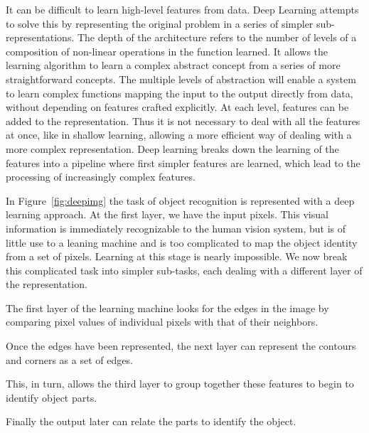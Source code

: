 It can be difficult to learn high-level features from data. Deep Learning attempts to solve this by representing the original problem in a series of simpler sub-representations. The depth of the architecture refers to the number of levels of a composition of non-linear operations in the function learned. It allows the learning algorithm to learn a complex abstract concept from a series of more straightforward concepts. The multiple levels of abstraction will enable a system to learn complex functions mapping the input to the output directly from data, without depending on features crafted explicitly. At each level, features can be added to the representation. Thus it is not necessary to deal with all the features at once, like in shallow learning, allowing a more efficient way of dealing with a more complex representation. Deep learning breaks down the learning of the features into a pipeline where first simpler features are learned, which lead to the processing of increasingly complex features. 



In Figure~\ref{fig:deepimg} the task of object recognition is represented with a deep learning approach. At the first layer, we have the input pixels. This visual information is immediately recognizable to the human vision system, but is of little use to a leaning machine and is too complicated to map the object identity from a set of pixels. Learning at this stage is nearly impossible. We now break this complicated task into simpler sub-tasks, each dealing with a different layer of the representation. 
\begin{itemize*}
\item The first layer of the learning machine looks for the edges in the image by comparing pixel values of individual pixels with that of their neighbors. 
\item Once the edges have been represented, the next layer can represent the contours and corners as a set of edges. 
\item This, in turn, allows the third layer to group together these features to begin to identify object parts. 
\item Finally the output later can relate the parts to identify the object.
\end{itemize*}  



